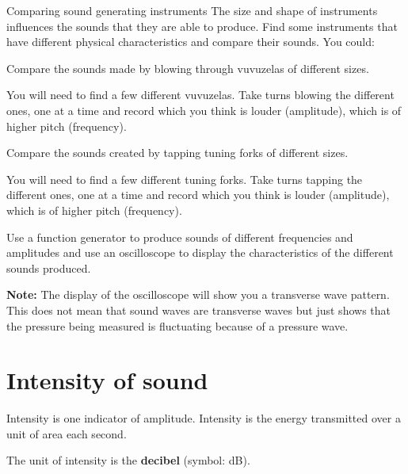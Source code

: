 \begin{activity}{Comparing sound generating instruments}
The size and shape of instruments influences the sounds that they are able to produce. Find some instruments that have different physical characteristics and compare their sounds. You could:\par\hspace{1cm}
\begin{minipage}{.28\columnwidth}
Compare the sounds made by blowing through vuvuzelas of different sizes.
\par
You will need to find a few different vuvuzelas. Take turns blowing the different ones, one at a time and record which you think is louder (amplitude), which is of higher pitch (frequency).
\end{minipage}\hspace{.05\columnwidth}
\begin{minipage}{.28\columnwidth}
Compare the sounds created by tapping tuning forks of different sizes.
\par
You will need to find a few different tuning forks. Take turns tapping the different ones, one at a time and record which you think is louder (amplitude), which is of higher pitch (frequency).
\end{minipage}\hspace{.05\columnwidth}
\begin{minipage}{.28\columnwidth}
Use a function generator to produce sounds of different frequencies and amplitudes and use an oscilloscope to display the characteristics of the different sounds produced. 

\textbf{Note:} The display of the oscilloscope will show you a transverse wave pattern. This does not mean that sound waves are transverse waves but just shows that the pressure being measured is fluctuating because of a pressure wave.
\end{minipage}


\end{activity}

            \section*{Intensity of sound}
            \nopagebreak

	\par
      \label{m38800*id184075}Intensity is one indicator of amplitude. Intensity is the energy transmitted over a unit of area each second.\par 
\label{m38800*id184185}The unit of intensity is the \textbf{decibel} (symbol: dB).

